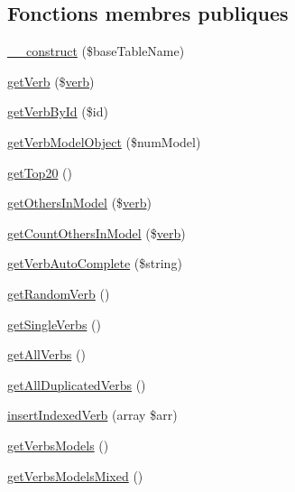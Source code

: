 \subsection*{Fonctions membres publiques}
\begin{DoxyCompactItemize}
\item 
\hyperlink{class_conjugation_data_provider_base_ad87a3d61f1cfae6a5e8e6506d1e9b57a}{\+\_\+\+\_\+construct} (\$base\+Table\+Name)
\item 
\hyperlink{class_conjugation_data_provider_base_a45ac93643d08f3099bf95faa22e9ba55}{get\+Verb} (\$\hyperlink{teibase_8php_aa8d8fadfcf4239c7aa288414da9d0ace}{verb})
\item 
\hyperlink{class_conjugation_data_provider_base_a8269abd2a9be2679d2cd9f7f50ae9151}{get\+Verb\+By\+Id} (\$id)
\item 
\hyperlink{class_conjugation_data_provider_base_a4be78cfcdc11584d355bdfc8b988a3ca}{get\+Verb\+Model\+Object} (\$num\+Model)
\item 
\hyperlink{class_conjugation_data_provider_base_aafcbd6631477f8f634d762b5ba5dc217}{get\+Top20} ()
\item 
\hyperlink{class_conjugation_data_provider_base_a964e48a9e1d9c507fdb19e96737c09e4}{get\+Others\+In\+Model} (\$\hyperlink{teibase_8php_aa8d8fadfcf4239c7aa288414da9d0ace}{verb})
\item 
\hyperlink{class_conjugation_data_provider_base_a155bfe75cdc9224801c2704540205650}{get\+Count\+Others\+In\+Model} (\$\hyperlink{teibase_8php_aa8d8fadfcf4239c7aa288414da9d0ace}{verb})
\item 
\hyperlink{class_conjugation_data_provider_base_a517127918e71fd89e1b7717c26353f87}{get\+Verb\+Auto\+Complete} (\$string)
\item 
\hyperlink{class_conjugation_data_provider_base_aa23d566d02578adb55592bba5a796fa8}{get\+Random\+Verb} ()
\item 
\hyperlink{class_conjugation_data_provider_base_a3a209dff42ff754afa7c81a8182266d7}{get\+Single\+Verbs} ()
\item 
\hyperlink{class_conjugation_data_provider_base_af3d127433543eb86878447357d6382d4}{get\+All\+Verbs} ()
\item 
\hyperlink{class_conjugation_data_provider_base_a645b9064803b3f6b9796fbacdb26548b}{get\+All\+Duplicated\+Verbs} ()
\item 
\hyperlink{class_conjugation_data_provider_base_af619b3848a7928bc7e8f649de46e9686}{insert\+Indexed\+Verb} (array \$arr)
\item 
\hyperlink{class_conjugation_data_provider_base_a12389ca76dbe2e31e08fee6b5333eed9}{get\+Verbs\+Models} ()
\item 
\hyperlink{class_conjugation_data_provider_base_a779d612fb1e1d20ea7fc31511768ad66}{get\+Verbs\+Models\+Mixed} ()
\end{DoxyCompactItemize}
